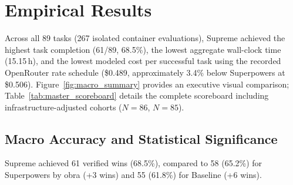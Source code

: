 \section{Empirical Results}
\label{sec:results}

Across all 89 tasks (267 isolated container evaluations), Supreme achieved the highest task completion (61/89, 68.5\%), the lowest aggregate wall-clock time (15.15\,h), and the lowest modeled cost per successful task using the recorded OpenRouter rate schedule (\$0.489, approximately 3.4\% below Superpowers at \$0.506). Figure~\ref{fig:macro_summary} provides an executive visual comparison; Table~\ref{tab:master_scoreboard} details the complete scoreboard including infrastructure-adjusted cohorts ($N=86$, $N=85$).

\begin{table}[t]
\centering
\caption{CARB-v4 Master Scoreboard across all 89 Terminal-Bench 2.1 tasks on Gemini 3.6 Flash High. Brackets denote Wilson 95\% score confidence intervals. Adjusted scores exclude three tasks with verified upstream container environment defects ($N=86$); a further conservative cohort excluding all four infrastructure-impaired tasks ($N=85$) is reported in Section~\ref{sec:case_studies}.}
\label{tab:master_scoreboard}
\end{table}

\subsection{Macro Accuracy and Statistical Significance}
Supreme achieved 61 verified wins (68.5\%), compared to 58 (65.2\%) for Superpowers by obra (+3 wins) and 55 (61.8\%) for Baseline (+6 wins).

